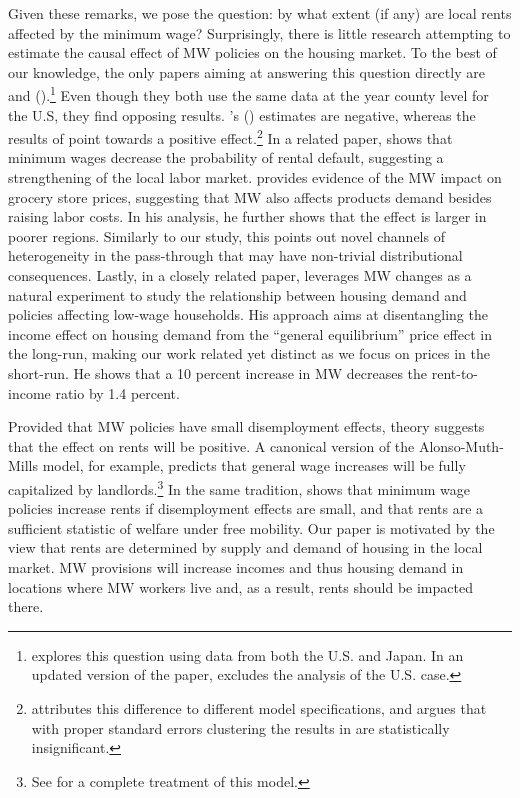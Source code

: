 Given these remarks, we pose the question: by what extent (if any) are local rents affected 
by the minimum wage? Surprisingly, there is little research attempting to estimate 
the causal effect of MW policies on the housing market. To the best of our knowledge, the 
only papers aiming at answering this question directly are \textcite{Tidemann2018} and 
\citeauthor{Yamagishi2019} (\citeyear{Yamagishi2019, Yamagishi2020}).\footnote{
	\textcite{Yamagishi2019} explores this question using data from both the U.S. and Japan. 
	In an updated version of the paper, \textcite{Yamagishi2020} excludes the analysis of 
	the U.S. case.}
Even though they both use the same data at the year county level for the U.S, they find 
opposing results. \citeauthor{Tidemann2018}'s (\citeyear{Tidemann2018}) estimates are negative, 
whereas the results of \textcite{Yamagishi2019} point towards a positive effect.\footnote{
	\textcite{Yamagishi2019} attributes this difference to different model specifications, and 
	argues that with proper standard errors clustering the results in \textcite{Tidemann2018} 
	are statistically insignificant.} 
In a related paper, \textcite{AgarwalEtAl2019} shows that minimum wages decrease the 
probability of rental default, suggesting a strengthening of the local labor market. 
\textcite{Leung2018} provides evidence of the MW impact on grocery store prices, suggesting 
that MW also affects products demand besides raising labor costs. In his analysis, he further 
shows that the effect is larger in poorer regions. Similarly to our study, this points out 
novel channels of heterogeneity in the pass-through that may have non-trivial distributional 
consequences.
Lastly, in a closely related paper, \textcite{Hughes2020} leverages MW changes as a natural 
experiment to study the relationship between housing demand and policies affecting low-wage 
households. His approach aims at disentangling the income effect on housing demand from the 
``general equilibrium'' price effect in the long-run, making our work related yet distinct as 
we focus on prices in the short-run. He shows that a 10 percent increase in MW decreases the 
rent-to-income ratio by 1.4 percent. 

Provided that MW policies have small disemployment effects, theory suggests that the effect 
on rents will be positive. A canonical version of the Alonso-Muth-Mills model, for example, 
predicts that general wage increases will be fully capitalized by landlords.\footnote{See 
	\textcite{Brueckner1987} for a complete treatment of this model.} 
In the same tradition, \textcite{Yamagishi2020} shows that minimum wage policies increase 
rents if disemployment effects are small, and that rents are a sufficient statistic of welfare 
under free mobility. Our paper is motivated by the view that rents are determined by supply 
and demand of housing in the local market. MW provisions will increase incomes and thus 
housing demand in locations where MW workers live and, as a result, rents should be impacted 
there.

